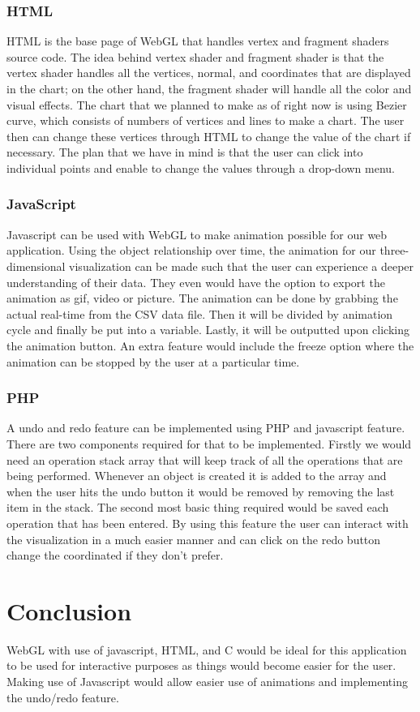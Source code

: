 \documentclass[journal,10pt,onecolumn,compsoc]{IEEEtran} \usepackage[margin=1.0in]{geometry} \usepackage{pdfpages}
\begin{document}
        \subsubsection{HTML}
         HTML is the base page of WebGL that handles vertex and fragment shaders source code. The idea behind vertex shader and fragment shader is that the vertex shader handles all the vertices, normal, and coordinates that are displayed in the chart; on the other hand, the fragment shader will handle all the color and visual effects. The chart that we planned to make as of right now is using Bezier curve, which consists of numbers of vertices and lines to make a chart. The user then can change these vertices through HTML to change the value of the chart if necessary. The plan that we have in mind is that the user can click into individual points and enable to change the values through a drop-down menu.
         
        \subsubsection{JavaScript}
         Javascript can be used with WebGL to make animation possible for our web application. Using the object relationship over time, the animation for our three-dimensional visualization can be made such that the user can experience a deeper understanding of their data. They even would have the option to export the animation as gif, video or picture. The animation can be done by grabbing the actual real-time from the CSV data file. Then it will be divided by animation cycle and finally be put into a variable. Lastly, it will be outputted upon clicking the animation button. An extra feature would include the freeze option where the animation can be stopped by the user at a particular time. 

        \subsubsection{PHP}
        A undo and redo feature can be implemented using PHP and javascript feature. There are two components required for that to be implemented. Firstly we would need an operation stack array that will keep track of all the operations that are being performed. Whenever an object is created it is added to the array and when the user hits the undo button it would be removed by removing the last item in the stack. The second most basic thing required would be saved each operation that has been entered. By using this feature the user can interact with the visualization in a much easier manner and can click on the redo button change the coordinated if they don’t prefer.

\section{Conclusion}
 WebGL with use of javascript, HTML, and C would be ideal for this application to be used for interactive purposes as things would become easier for the user. Making use of Javascript would allow easier use of animations and implementing the undo/redo feature. 

 
   
\end{document}
